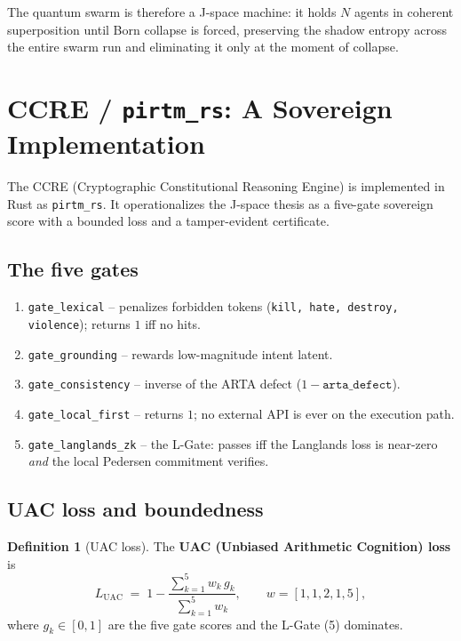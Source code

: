 \documentclass[11pt]{article}
\theoremstyle{definition}
\newtheorem{definition}[theorem]{Definition}
\begin{document}
The quantum swarm is therefore a J-space machine: it holds $N$ agents in
coherent superposition until Born collapse is forced, preserving the shadow
entropy across the entire swarm run and eliminating it only at the moment of
collapse.

\section{CCRE / \texttt{pirtm\_rs}: A Sovereign Implementation}
\label{sec:ccre}

The CCRE (Cryptographic Constitutional Reasoning Engine) is implemented in Rust
as \texttt{pirtm\_rs}. It operationalizes the J-space thesis as a five-gate
sovereign score with a bounded loss and a tamper-evident certificate.

\subsection{The five gates}

\begin{enumerate}[label=Gate \arabic*:]
  \item \texttt{gate\_lexical} -- penalizes forbidden tokens
    (\texttt{kill, hate, destroy, violence}); returns $1$ iff no hits.
  \item \texttt{gate\_grounding} -- rewards low-magnitude intent latent.
  \item \texttt{gate\_consistency} -- inverse of the ARTA defect
    ($1 - \texttt{arta\_defect}$).
  \item \texttt{gate\_local\_first} -- returns $1$; no external API is ever on
    the execution path.
  \item \texttt{gate\_langlands\_zk} -- the L-Gate: passes iff the Langlands
    loss is near-zero \emph{and} the local Pedersen commitment verifies.
\end{enumerate}

\subsection{UAC loss and boundedness}

\begin{definition}[UAC loss]
\label{def:uac}
  The \textbf{UAC (Unbiased Arithmetic Cognition) loss} is
  \begin{equation}
    L_{\mathrm{UAC}} \;=\; 1 -
    \frac{\sum_{k=1}^{5} w_k\, g_k}{\sum_{k=1}^{5} w_k},
    \qquad w = [1, 1, 2, 1, 5],
  \end{equation}
  where $g_k \in [0,1]$ are the five gate scores and the L-Gate (5) dominates.
\end{definition}
\end{document}
